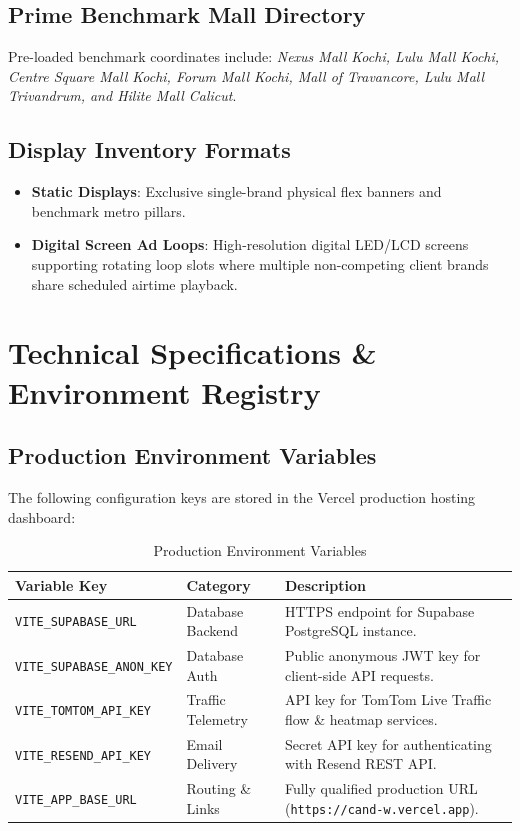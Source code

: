 \documentclass[11pt,a4paper]{article}
\begin{document}
\subsection{Prime Benchmark Mall Directory}
Pre-loaded benchmark coordinates include: \textit{Nexus Mall Kochi, Lulu Mall Kochi, Centre Square Mall Kochi, Forum Mall Kochi, Mall of Travancore, Lulu Mall Trivandrum, and Hilite Mall Calicut}.

\subsection{Display Inventory Formats}
\begin{itemize}[leftmargin=1.5em, itemsep=2pt]
    \item \textbf{Static Displays}: Exclusive single-brand physical flex banners and benchmark metro pillars.
    \item \textbf{Digital Screen Ad Loops}: High-resolution digital LED/LCD screens supporting rotating loop slots where multiple non-competing client brands share scheduled airtime playback.
\end{itemize}

\newpage

\section{Technical Specifications \& Environment Registry}

\subsection{Production Environment Variables}
The following configuration keys are stored in the Vercel production hosting dashboard:

\begin{table}[h!]
\centering
\small
\renewcommand{\arraystretch}{1.3}
\begin{tabularx}{\textwidth}{p{4.5cm} p{3.5cm} X}
\toprule
\textbf{Variable Key} & \textbf{Category} & \textbf{Description} \\
\midrule
\texttt{VITE\_SUPABASE\_URL} & Database Backend & HTTPS endpoint for Supabase PostgreSQL instance. \\
\texttt{VITE\_SUPABASE\_ANON\_KEY} & Database Auth & Public anonymous JWT key for client-side API requests. \\
\texttt{VITE\_TOMTOM\_API\_KEY} & Traffic Telemetry & API key for TomTom Live Traffic flow \& heatmap services. \\
\texttt{VITE\_RESEND\_API\_KEY} & Email Delivery & Secret API key for authenticating with Resend REST API. \\
\texttt{VITE\_APP\_BASE\_URL} & Routing \& Links & Fully qualified production URL (\texttt{https://cand-w.vercel.app}). \\
\bottomrule
\end{tabularx}
\caption{Production Environment Variables}
\end{table}
\end{document}
